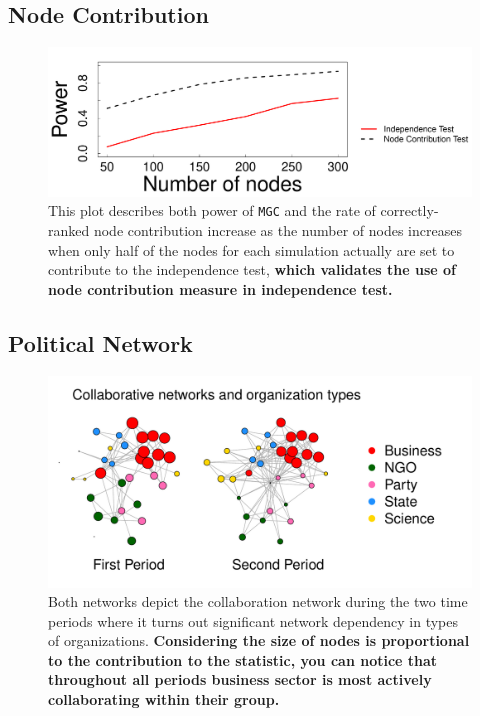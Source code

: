 \documentclass[12pt]{article}
\begin{document}
\subsection*{Node Contribution}

\begin{figure}[h]
	\centering
		\includegraphics[width=0.8\linewidth]{../../Figure/nodecontri.pdf}
	\caption{This plot describes both power of \texttt{MGC} and the rate of correctly-ranked node contribution increase as the number of nodes increases when only half of the nodes for each simulation actually are set to contribute to the independence test, \textbf{which validates the use of node contribution measure in independence test.}}
	\label{fig:contribution}
\end{figure}


\subsection*{Political Network}

\begin{figure}[H]
	\centering
		\includegraphics[width=\linewidth]{../../Figure/two_politics.pdf}
	\caption{Both networks depict the collaboration network during the two time periods where it turns out significant network dependency in types of organizations. \textbf{Considering the size of nodes is proportional to the contribution to the statistic, you can notice that throughout all periods business sector is most actively collaborating within their group.}}
	\label{fig:politics}
\end{figure}
\end{document}
